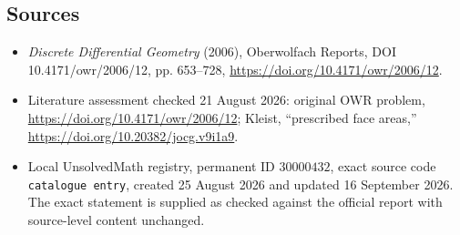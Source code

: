 \documentclass[11pt]{article}
\begin{document}
\subsection{Sources}
\begin{itemize}
\item \emph{Discrete Differential Geometry} (2006), Oberwolfach Reports, DOI 10.4171/owr/2006/12, pp. 653--728, \url{https://doi.org/10.4171/owr/2006/12}.
\item Literature assessment checked 21 August 2026: original OWR problem, \url{https://doi.org/10.4171/owr/2006/12}; Kleist, ``prescribed face areas,'' \url{https://doi.org/10.20382/jocg.v9i1a9}.
\item Local UnsolvedMath registry, permanent ID $30000432$, exact source code \texttt{catalogue entry}, created 25 August 2026 and updated 16 September 2026. The exact statement is supplied as checked against the official report with source-level content unchanged.
\end{itemize}
\end{document}
